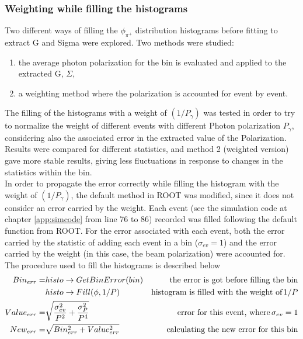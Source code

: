 \subsubsection{Weighting while filling the histograms} \label{sec:weighthisto}
Two different ways of filling the $\phi_{\pi^+}$ distribution histograms before fitting to extract G and Sigma were explored. Two methods were studied:
\begin{enumerate}
\item the average photon polarization for the bin is evaluated and applied to the extracted G, $\Sigma$, 
\item  a weighting method where the polarization is accounted for event by event.
\end{enumerate}
 The filling of the histograms with a weight of $(1/P_{\gamma})$ was tested in order to try to normalize the weight of different events with different Photon polarization  $P_{\gamma}$, considering also the associated error in the extracted value of the Polarization. Results were compared for different statistics, and method 2 (weighted version) gave more stable results, giving less fluctuations in response to changes in the statistics within the bin. \\
In order to propagate the error correctly while filling the histogram with the weight of $(1/P_{\gamma})$, the default method in ROOT was modified, since it does not consider an error carried by the weight.
Each event (see the simulation code at chapter \ref{app:simcode} from line 76 to 86) recorded was filled following the default function from ROOT. For the error associated with each event, both the error carried by the statistic of adding each event in a bin ($\sigma_{ev} = 1$) and the error carried by the weight (in this case, the beam polarization) were accounted for. The procedure used to fill the histograms is described below 
\begin{align}
  Bin_{err} = & histo\rightarrow GetBinError(bin) &  \textnormal{the error is  got before filling the bin} \\
  &  histo\rightarrow Fill(\phi,1/P) & \textnormal{histogram is filled with the weight of}\, 1/P \\
  Value_{err} = & \sqrt{\frac{\sigma_{ev}^2}{P^2} + \frac{\sigma_P^2}{P^4}} & \textnormal{error for this event, where}\, \sigma_{ev}=1 \\
  New_{err} = & \sqrt{Bin_{err}^2 + Value_{err}^2} & \textnormal{calculating the new error for this bin}
\end{align}

